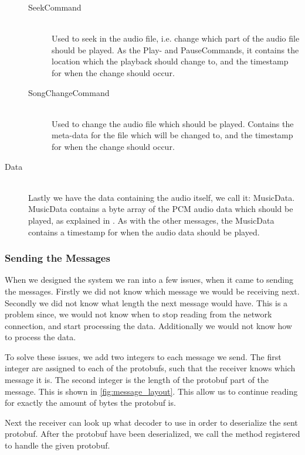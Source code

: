 \begin{description}
\begin{description}
            \item[SeekCommand] \hfill\\
                Used to seek in the audio file, i.e. change which part of the audio file should be played.
                As the Play- and PauseCommands, it contains the location which the playback should change to, and the timestamp for when the change should occur.
            \item[SongChangeCommand] \hfill\\
                Used to change the audio file which should be played.
                Contains the meta-data for the file which will be changed to, and the timestamp for when the change should occur.
        \end{description}

    \item[Data] \hfill \\
        Lastly we have the data containing the audio itself, we call it: MusicData.
        MusicData contains a byte array of the \ac{PCM} audio data which should be played, as explained in .
        As with the other messages, the MusicData contains a timestamp for when the audio data should be played.
\end{description}

\subsubsection*{Sending the Messages}
When we designed the system we ran into a few issues, when it came to sending the messages.
Firstly we did not know which message we would be receiving next.
Secondly we did not know what length the next message would have.
This is a problem since, we would not know when to stop reading from the network connection, and start processing the data.
Additionally we would not know how to process the data.

To solve these issues, we add two integers to each message we send.
The first integer are assigned to each of the protobufs, such that the receiver knows which message it is.
The second integer is the length of the protobuf part of the message.
This is shown in \cref{fig:message_layout}.
This allow us to continue reading for exactly the amount of bytes the protobuf is.

Next the receiver can look up what decoder to use in order to deserialize the sent protobuf.
After the protobuf have been deserialized, we call the method registered to handle the given protobuf. 

